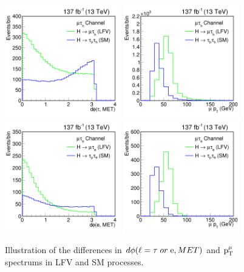 \begin{figure}[htbp]
  \centering
  \includegraphics[width=0.45\textwidth]{plots/chapter6/LFVvSM/MTdphi.png}
  \includegraphics[width=0.45\textwidth]{plots/chapter6/LFVvSM/MTmpt.png} \\
  \includegraphics[width=0.45\textwidth]{plots/chapter6/LFVvSM/MEdphi.png}
  \includegraphics[width=0.45\textwidth]{plots/chapter6/LFVvSM/MEmpt.png} \\
  \caption{Illustration of the differences in $d\phi(\ell = \tau \; or \; \text{e}, MET)$ and $\text{p}_\text{T}^{\mu}$ spectrums in LFV and SM \Htt processes.}
  \label{fig:htt_v_lfv_mt}
\end{figure}

